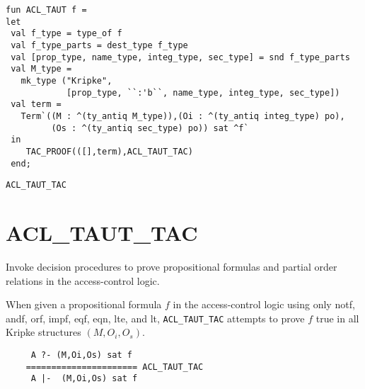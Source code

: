 \IMPLEMENTATION
\begin{holboxed}
\begin{verbatim}
fun ACL_TAUT f =
let
 val f_type = type_of f
 val f_type_parts = dest_type f_type
 val [prop_type, name_type, integ_type, sec_type] = snd f_type_parts
 val M_type = 
   mk_type ("Kripke",
            [prop_type, ``:'b``, name_type, integ_type, sec_type])
 val term = 
   Term`((M : ^(ty_antiq M_type)),(Oi : ^(ty_antiq integ_type) po),
         (Os : ^(ty_antiq sec_type) po)) sat ^f`
 in
    TAC_PROOF(([],term),ACL_TAUT_TAC)
 end;
\end{verbatim}
\end{holboxed}

\SEEALSO
\texttt{ACL\_TAUT\_TAC}
\ENDDOC

\section{ACL\_TAUT\_TAC}



\egroup

\SYNOPSIS Invoke decision procedures to prove propositional formulas
and partial order relations in the access-control logic.

\DESCRIBE When given a propositional formula $f$ in the access-control
logic using only notf, andf, orf, impf, eqf, eqn, lte, and lt,
\texttt{ACL_TAUT_TAC} attempts to prove $f$ true in all Kripke
structures $(M,O_i,O_s)$.
\begin{verbatim}
     A ?- (M,Oi,Os) sat f
    ====================== ACL_TAUT_TAC 
     A |-  (M,Oi,Os) sat f
\end{verbatim}

